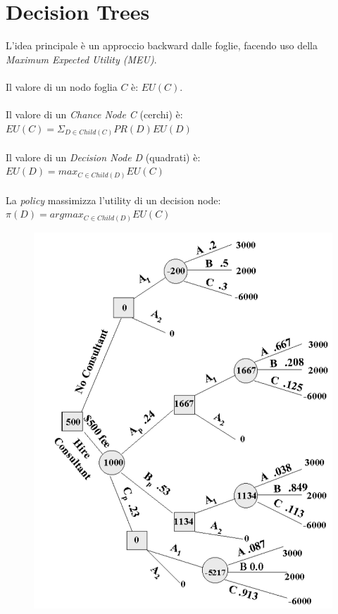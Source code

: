 \documentclass[a4paper, notitlepage, 9pt]{extreport}
\begin{document}
\section*{Decision Trees}
\begin{multicols}{2}
	\noindent
	L'idea principale è un approccio backward dalle foglie, facendo uso della \textit{Maximum Expected Utility (MEU)}.\\\\
	Il valore di un nodo foglia $C$ è: $EU(C)$.\\\\
	Il valore di un \textit{Chance Node C} (cerchi) è:\\$EU(C) = \Sigma_{D\in Child(C)} PR(D)EU(D)$\\\\
	Il valore di un \textit{Decision Node D} (quadrati) è:\\$EU(D) = max_{C\in Child(D)} EU(C)$\\\\
	La \textit{policy} massimizza l'utility di un decision node:\\
	$\pi(D) = arg max_{C\in Child(D)} EU(C)$
	\columnbreak
	\begin{figure}[H]
		\centering
		\includegraphics[scale=0.27]{DecTree}
	\end{figure}
\end{multicols}
\end{document}
